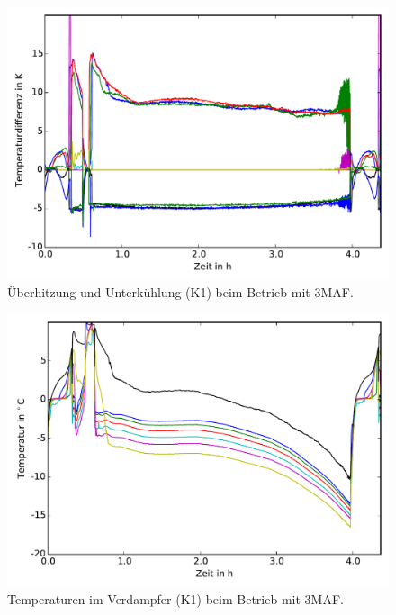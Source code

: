 \begin{figure}[h!]
\centering
\includegraphics[scale=0.8]{Pictures/35/deltaTs_lastCycle.pdf}
\caption{Überhitzung und Unterkühlung (K1) beim Betrieb mit 3MAF.}
\label{fig:deltaT35}
\end{figure}

\begin{figure}[h!]
\centering
\includegraphics[scale=0.8]{Pictures/35/T_evap_C1_lastCycle.pdf}
\caption{Temperaturen im Verdampfer (K1) beim Betrieb mit 3MAF.}
\label{fig:deltaT35}
\end{figure}

